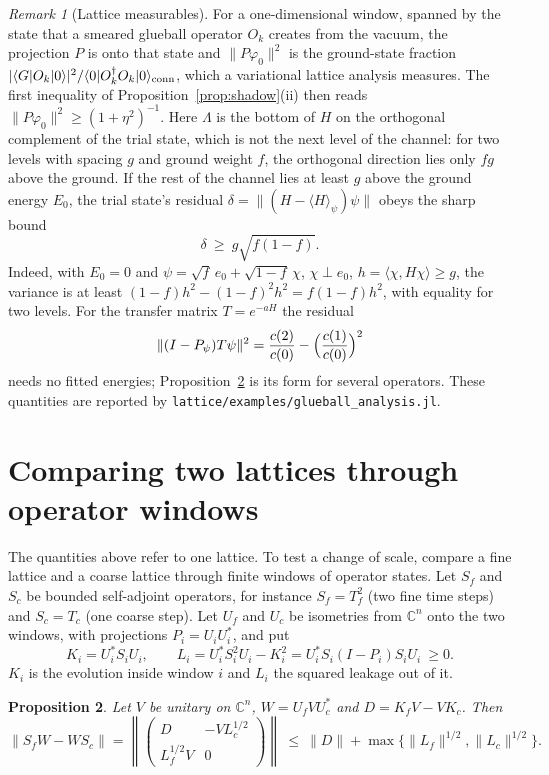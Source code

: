 \documentclass[11pt]{article}
\newtheorem{proposition}{Proposition}
\theoremstyle{remark}
\newtheorem{remark}[proposition]{Remark}
\begin{document}
\begin{remark}[Lattice measurables]
For a one-dimensional window, spanned by the state that a smeared glueball operator $O_k$ creates from the vacuum, the projection $P$ is onto that state and $\|P\varphi_0\|^2$ is the ground-state fraction $|\langle G|O_k|0\rangle|^2/\langle0|O_k^\dagger O_k|0\rangle_{\rm conn}$, which a variational lattice analysis measures. The first inequality of Proposition~\ref{prop:shadow}(ii) then reads $\|P\varphi_0\|^2\ge(1+\eta^2)^{-1}$. Here $\Lambda$ is the bottom of $H$ on the orthogonal complement of the trial state, which is not the next level of the channel: for two levels with spacing $g$ and ground weight $f$, the orthogonal direction lies only $fg$ above the ground. If the rest of the channel lies at least $g$ above the ground energy $E_0$, the trial state's residual $\delta=\|(H-\langle H\rangle_\psi)\psi\|$ obeys the sharp bound
\[
 \delta\ \ge\ g\sqrt{f(1-f)} .
\]
Indeed, with $E_0=0$ and $\psi=\sqrt f\,e_0+\sqrt{1-f}\,\chi$, $\chi\perp e_0$, $h=\langle\chi,H\chi\rangle\ge g$, the variance is at least $(1-f)h^2-(1-f)^2h^2=f(1-f)h^2$, with equality for two levels. For the transfer matrix $T=e^{-aH}$ the residual
\[
 \|(I-P_\psi)T\psi\|^2=\frac{c(2)}{c(0)}-\Bigl(\frac{c(1)}{c(0)}\Bigr)^2
\]
needs no fitted energies; Proposition~\ref{prop:windows} is its form for several operators. These quantities are reported by \texttt{lattice/examples/glueball\_analysis.jl}.
\end{remark}

\section{Comparing two lattices through operator windows}

The quantities above refer to one lattice. To test a change of scale, compare a fine lattice and a coarse lattice through finite windows of operator states. Let $S_f$ and $S_c$ be bounded self-adjoint operators, for instance $S_f=T_f^2$ (two fine time steps) and $S_c=T_c$ (one coarse step). Let $U_f$ and $U_c$ be isometries from $\mathbb C^n$ onto the two windows, with projections $P_i=U_iU_i^*$, and put
\[
 K_i=U_i^*S_iU_i,\qquad L_i=U_i^*S_i^2U_i-K_i^2=U_i^*S_i(I-P_i)S_iU_i\ \ge0 .
\]
$K_i$ is the evolution inside window $i$ and $L_i$ the squared leakage out of it.

\begin{proposition}\label{prop:windows}
Let $V$ be unitary on $\mathbb C^n$, $W=U_fVU_c^*$ and $D=K_fV-VK_c$. Then
\[
 \|S_fW-WS_c\|=\left\|\begin{pmatrix}D&-VL_c^{1/2}\\ L_f^{1/2}V&0\end{pmatrix}\right\|
 \ \le\ \|D\|+\max\bigl\{\|L_f\|^{1/2},\|L_c\|^{1/2}\bigr\} .
\]
\end{proposition}
\end{document}
